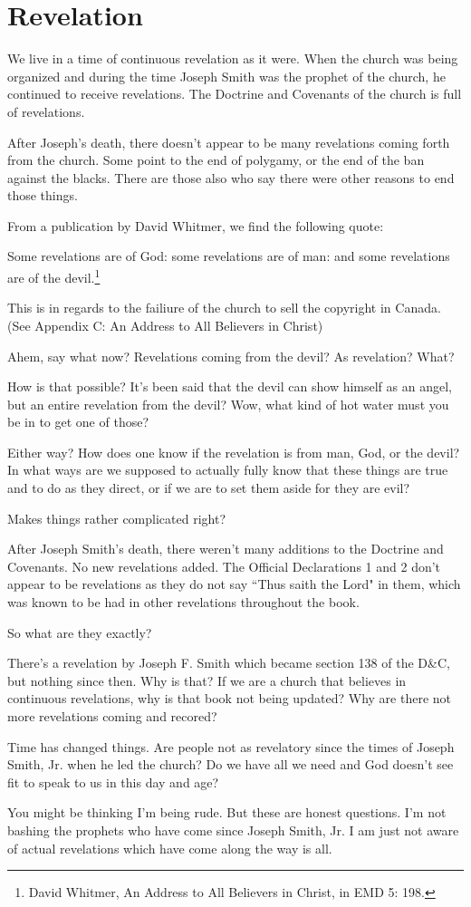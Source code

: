 \section{Revelation}

We live in a time of continuous revelation as it were. When the church was
being organized and during the time Joseph Smith was the prophet of the church,
he continued to receive revelations. The Doctrine and Covenants of the church
is full of revelations.

After Joseph's death, there doesn't appear to be many revelations coming forth
from the church. Some point to the end of polygamy, or the end of the ban 
against the blacks. There are those also who say there were other reasons
to end those things.

From a publication by David Whitmer, we find the following quote:

\begin{displayquote}
Some revelations are of God: 
some revelations are of man: 
and some revelations are of the devil.\footnote{David Whitmer, 
An Address to All Believers in Christ, in EMD 5: 198.}
\end{displayquote}

This is in regards to the failiure of the church to sell the copyright in
Canada. (See Appendix C: An Address to All Believers in Christ)

Ahem, say what now? Revelations coming from the devil? As revelation? What?

How is that possible? It's been said that the devil can show himself as an 
angel, but an entire revelation from the devil? Wow, what kind of hot water
must you be in to get one of those?

Either way? How does one know if the revelation is from man, God, or the devil?
In what ways are we supposed to actually fully know that these things are
true and to do as they direct, or if we are to set them aside for they are evil?

Makes things rather complicated right?

After Joseph Smith's death, there weren't many additions to the Doctrine and
Covenants. No new revelations added. The Official Declarations 1 and 2 don't
appear to be revelations as they do not say ``Thus saith the Lord" in them,
which was known to be had in other revelations throughout the book.

So what are they exactly?

There's a revelation by Joseph F. Smith which became section 138 of the D\&C,
but nothing since then. Why is that? If we are a church that believes in
continuous revelations, why is that book not being updated? Why are there
not more revelations coming and recored?

Time has changed things. Are people not as revelatory since the times of
Joseph Smith, Jr. when he led the church? Do we have all we need and God doesn't
see fit to speak to us in this day and age?

You might be thinking I'm being rude. But these are honest questions. I'm not
bashing the prophets who have come since Joseph Smith, Jr. I am just not aware
of actual revelations which have come along the way is all.